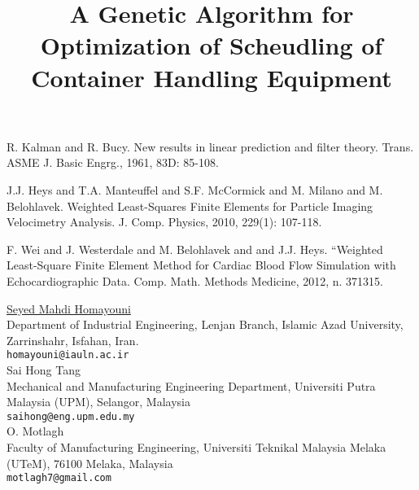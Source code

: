 \documentclass[article,A4,11pt]{llncs}%
\begin{document}

\begin{thebibliography}{10}
{\sc R. Kalman and R. Bucy}. {New results in linear prediction and filter theory}. Trans. ASME J. Basic Engrg., 1961, 83D: 85-108.

{\sc J.J. Heys and T.A. Manteuffel and S.F. McCormick and M. Milano and M. Belohlavek}. {Weighted Least-Squares Finite Elements for Particle Imaging Velocimetry Analysis}.  J. Comp. Physics, 2010, 229(1): 107-118.

{\sc F. Wei and J. Westerdale and M. Belohlavek and and J.J. Heys}. {“Weighted Least-Square Finite Element Method for Cardiac Blood Flow Simulation with Echocardiographic Data}. Comp. Math. Methods Medicine, 2012, n. 371315.
\end{thebibliography}

\title{A Genetic Algorithm for Optimization of Scheudling of Container Handling Equipment}
 \author{} \institute{}
\maketitle
\begin{center}
{\large \underline{Seyed Mahdi Homayouni}}\\
Department of Industrial Engineering, Lenjan Branch, Islamic Azad University, Zarrinshahr, Isfahan, Iran.\\
{\tt homayouni@iauln.ac.ir}
\\ \vspace{4mm}
{\large Sai Hong Tang}\\
Mechanical and Manufacturing Engineering Department, Universiti Putra Malaysia (UPM), Selangor, Malaysia\\
{\tt saihong@eng.upm.edu.my}
\\ \vspace{4mm}
{\large O.  Motlagh}\\
Faculty of Manufacturing Engineering, Universiti Teknikal Malaysia Melaka (UTeM), 76100 Melaka, Malaysia\\
{\tt motlagh7@gmail.com}
\end{center}
\end{document}
